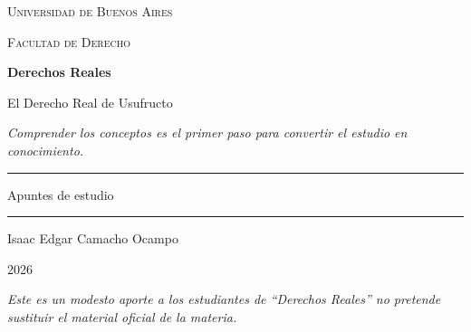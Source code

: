 \documentclass[12pt,oneside]{book}
\newcommand{\universidad}{Universidad de Buenos Aires}
\newcommand{\facultad}{Facultad de Derecho}
\newcommand{\materia}{Derechos Reales}
\newcommand{\titulo}{El Derecho Real de Usufructo}
\newcommand{\autor}{Isaac Edgar Camacho Ocampo}
\newcommand{\anio}{2026}
\begin{document}
\begin{titlepage}

\thispagestyle{empty}

\begin{center}

\vspace*{1cm}

{\large \textsc{\universidad}}

\vspace{0.2cm}

{\large \textsc{\facultad}}

\vspace{3cm}

{\Huge \textbf{\materia}}

\vspace{1cm}

{\LARGE \titulo}

\vspace{0.8cm}

\textit{Comprender los conceptos es el primer paso para convertir el estudio en conocimiento.}

\vspace{1.2cm}

\rule{0.70\textwidth}{0.5pt}

\vspace{0.5cm}

{\large Apuntes de estudio}

\vspace{0.5cm}

\rule{0.70\textwidth}{0.5pt}

\vfill

{\large \autor}

\vspace{0.3cm}

{\large \anio}

\end{center}

\vfill

\begin{flushleft}
\textit{Este es un modesto aporte a los estudiantes de ``Derechos Reales'' no pretende sustituir el material oficial de la materia.}
\end{flushleft}

\end{titlepage}

\tableofcontents
\end{document}
